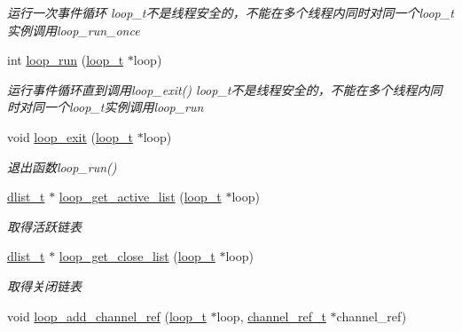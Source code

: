 \begin{DoxyCompactItemize}
\begin{DoxyCompactList}\small\item\em 运行一次事件循环 loop\+\_\+t不是线程安全的，不能在多个线程内同时对同一个loop\+\_\+t实例调用loop\+\_\+run\+\_\+once \end{DoxyCompactList}\item 
int \hyperlink{a00105_ga8eb0f6c8d398c70fc5ca2292664a1187_ga8eb0f6c8d398c70fc5ca2292664a1187}{loop\+\_\+run} (\hyperlink{a00051_a9c3ad1cd2de83e09f3a7b59fa82c94ee_a9c3ad1cd2de83e09f3a7b59fa82c94ee}{loop\+\_\+t} $\ast$loop)
\begin{DoxyCompactList}\small\item\em 运行事件循环直到调用loop\+\_\+exit() loop\+\_\+t不是线程安全的，不能在多个线程内同时对同一个loop\+\_\+t实例调用loop\+\_\+run \end{DoxyCompactList}\item 
void \hyperlink{a00105_ga898c7e8ef4ff2f360a32454b2b1013de_ga898c7e8ef4ff2f360a32454b2b1013de}{loop\+\_\+exit} (\hyperlink{a00051_a9c3ad1cd2de83e09f3a7b59fa82c94ee_a9c3ad1cd2de83e09f3a7b59fa82c94ee}{loop\+\_\+t} $\ast$loop)
\begin{DoxyCompactList}\small\item\em 退出函数loop\+\_\+run() \end{DoxyCompactList}\item 
\hyperlink{a00051_ad6644d67df4b4e3596c1eb12977d1d16_ad6644d67df4b4e3596c1eb12977d1d16}{dlist\+\_\+t} $\ast$ \hyperlink{a00069_a7c1a2360919bfff72d665f2651a8d080_a7c1a2360919bfff72d665f2651a8d080}{loop\+\_\+get\+\_\+active\+\_\+list} (\hyperlink{a00051_a9c3ad1cd2de83e09f3a7b59fa82c94ee_a9c3ad1cd2de83e09f3a7b59fa82c94ee}{loop\+\_\+t} $\ast$loop)
\begin{DoxyCompactList}\small\item\em 取得活跃链表 \end{DoxyCompactList}\item 
\hyperlink{a00051_ad6644d67df4b4e3596c1eb12977d1d16_ad6644d67df4b4e3596c1eb12977d1d16}{dlist\+\_\+t} $\ast$ \hyperlink{a00069_a282fa587372c0abd536f46a396cd41d4_a282fa587372c0abd536f46a396cd41d4}{loop\+\_\+get\+\_\+close\+\_\+list} (\hyperlink{a00051_a9c3ad1cd2de83e09f3a7b59fa82c94ee_a9c3ad1cd2de83e09f3a7b59fa82c94ee}{loop\+\_\+t} $\ast$loop)
\begin{DoxyCompactList}\small\item\em 取得关闭链表 \end{DoxyCompactList}\item 
void \hyperlink{a00069_ab4f4cfdde0b598a3e8267a5ff60775ec_ab4f4cfdde0b598a3e8267a5ff60775ec}{loop\+\_\+add\+\_\+channel\+\_\+ref} (\hyperlink{a00051_a9c3ad1cd2de83e09f3a7b59fa82c94ee_a9c3ad1cd2de83e09f3a7b59fa82c94ee}{loop\+\_\+t} $\ast$loop, \hyperlink{a00051_a151271c9d188ef28d4d24bb81dcc1263_a151271c9d188ef28d4d24bb81dcc1263}{channel\+\_\+ref\+\_\+t} $\ast$channel\+\_\+ref)

\end{DoxyCompactItemize}
